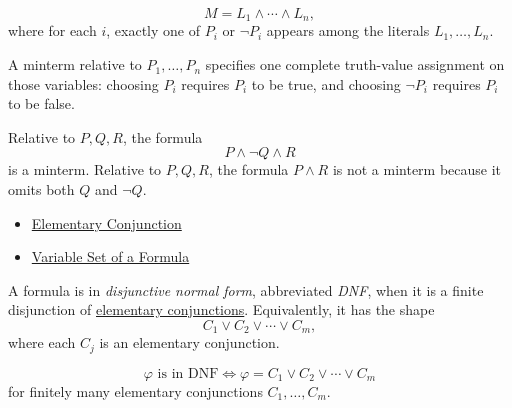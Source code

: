 \begin{remark*}
\[
M=L_1\land\cdots\land L_n,
\]
where for each \(i\), exactly one of \(P_i\) or \(\neg P_i\) appears among the
literals \(L_1,\ldots,L_n\).
\end{remark*}

\begin{remark*}[Interpretation]
A minterm relative to \(P_1,\ldots,P_n\) specifies one complete truth-value
assignment on those variables: choosing \(P_i\) requires \(P_i\) to be true,
and choosing \(\neg P_i\) requires \(P_i\) to be false.
\end{remark*}

\begin{example*}[Examples]
Relative to \(P,Q,R\), the formula
\[
P\land\neg Q\land R
\]
is a minterm. Relative to \(P,Q,R\), the formula \(P\land R\) is not a
minterm because it omits both \(Q\) and \(\neg Q\).
\end{example*}

\begin{dependencies}
\begin{itemize}
  \item \hyperref[def:elementary-conjunction-propositional-logic]{Elementary Conjunction}
  \item \hyperref[def:formula-variable-set-propositional-logic]{Variable Set of a Formula}
\end{itemize}
\end{dependencies}

\begin{tcolorbox}[colback=propbox, colframe=propborder, arc=2pt, left=6pt, right=6pt, top=4pt, bottom=4pt, title={\small\textbf{Definition (Disjunctive Normal Form)}}]
\begin{definition}
\label{def:disjunctive-normal-form-propositional-logic}
A formula is in \emph{disjunctive normal form}, abbreviated \emph{DNF}, when it
is a finite disjunction of
\hyperref[def:elementary-conjunction-propositional-logic]{elementary conjunctions}.
Equivalently, it has the shape
\[
C_1\lor C_2\lor\cdots\lor C_m,
\]
where each \(C_j\) is an elementary conjunction.
\end{definition}
\end{tcolorbox}

\begin{remark*}
\[
\varphi\text{ is in DNF}
\Longleftrightarrow
\varphi=C_1\lor C_2\lor\cdots\lor C_m
\]
for finitely many elementary conjunctions \(C_1,\ldots,C_m\).
\end{remark*}

